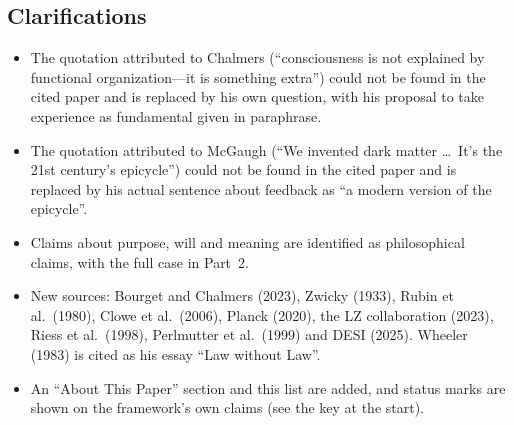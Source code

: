 \documentclass[11pt,a4paper]{article}
\begin{document}
\subsection*{Clarifications}
\begin{itemize}
  \item The quotation attributed to Chalmers (``consciousness is not explained by functional organization---it is something extra'') could not be found in the cited paper and is replaced by his own question, with his proposal to take experience as fundamental given in paraphrase.
  \item The quotation attributed to McGaugh (``We invented dark matter \ldots\ It's the 21st century's epicycle'') could not be found in the cited paper and is replaced by his actual sentence about feedback as ``a modern version of the epicycle''.
  \item Claims about purpose, will and meaning are identified as philosophical claims, with the full case in Part~2.
  \item New sources: Bourget and Chalmers (2023), Zwicky (1933), Rubin et al.\ (1980), Clowe et al.\ (2006), Planck (2020), the LZ collaboration (2023), Riess et al.\ (1998), Perlmutter et al.\ (1999) and DESI (2025). Wheeler (1983) is cited as his essay ``Law without Law''.
  \item An ``About This Paper'' section and this list are added, and status marks are shown on the framework's own claims (see the key at the start).
\end{itemize}

\newpage


\end{document}
